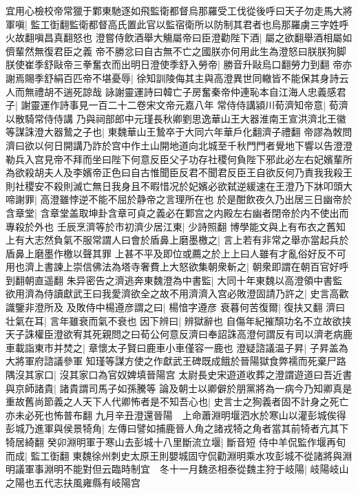 宜用心檢校帝常獵于鄴東馳逐如飛監衛都督烏那羅受工伐從後呼曰天子勿走馬大將軍嗔|{
	監工衘翻監衛都督高氏置此官以監宿衛所以防制其君者也烏那羅虜三字姓呼火故翻嗔昌真翻怒也}
澄嘗侍飲酒舉大觴屬帝曰臣澄勸陛下酒|{
	屬之欲翻舉酒相屬如儕輩然無復君臣之義}
帝不勝忿曰自古無不亡之國朕亦何用此生為澄怒曰朕朕狗脚朕使崔季舒敺帝三拳奮衣而出明日澄使季舒入勞帝|{
	勝音升敺烏口翻勞力到翻}
帝亦謝焉賜季舒絹百匹帝不堪憂辱|{
	徐知訓陵侮其主與高澄異世同轍皆不能保其身詩云人而無禮胡不遄死諒哉}
詠謝靈運詩曰韓亡子房奮秦帝仲連恥本自江海人忠義感君子|{
	謝靈運作詩事見一百二十二卷宋文帝元嘉八年}
常侍侍講潁川荀濟知帝意|{
	荀濟以散騎常侍侍講}
乃與祠部郎中元瑾長秋卿劉思逸華山王大器淮南王宣洪濟北王徽等謀誅澄大器鷙之子也|{
	東魏華山王鷙卒于大同六年華戶化翻濟子禮翻}
帝謬為敇問濟曰欲以何日開講乃詐於宫中作土山開地道向北城至千秋門門者覺地下響以告澄澄勒兵入宫見帝不拜而坐曰陛下何意反臣父子功存社稷何負陛下邪此必左右妃嬪輩所為欲殺胡夫人及李嬪帝正色曰自古惟聞臣反君不聞君反臣王自欲反何乃責我我殺王則社稷安不殺則滅亡無日我身且不暇惜况於妃嬪必欲弑逆緩速在王澄乃下牀叩頭大啼謝罪|{
	高澄雖悖逆不能不屈於静帝之言理所在也}
於是酣飲夜久乃出居三日幽帝於含章堂|{
	含章堂盖取坤卦含章可貞之義必在鄴宫之内殿左右幽者閉帝於内不使出而專殺於外也}
壬辰烹濟等於市初濟少居江東|{
	少詩照翻}
博學能文與上有布衣之舊知上有大志然負氣不服常謂人曰會於盾鼻上磨墨檄之|{
	言上若有非常之舉亦當起兵於盾鼻上磨墨作檄以聲其罪}
上甚不平及即位或薦之於上上曰人雖有才亂俗好反不可用也濟上書諫上崇信佛法為塔寺奢費上大怒欲集朝衆斬之|{
	朝衆即謂在朝百官好呼到翻朝直遥翻}
朱异密告之濟逃奔東魏澄為中書監|{
	大同十年東魏以高澄領中書監}
欲用濟為侍讀獻武王曰我愛濟欲全之故不用濟濟入宫必敗澄固請乃許之|{
	史言高歡識鑒非澄所及}
及敗侍中楊遵彦謂之曰|{
	楊愔字遵彦}
衰暮何苦復爾|{
	復扶又翻}
濟曰壮氣在耳|{
	言年雖衰而氣不衰也}
因下辨曰|{
	辨獄辭也}
自傷年紀摧頹功名不立故欲挟天子誅權臣澄欲宥其死親問之曰荀公何意反濟曰奉詔誅高澄何謂反有司以濟老病鹿車載詣東市并焚之|{
	章懷太子賢曰鹿車小車僅容一鹿也}
澄疑諮議温子昇|{
	子昇盖為大將軍府諮議參軍}
知瑾等謀方使之作獻武王碑既成餓於晉陽獄食弊襦而死棄尸路隅沒其家口|{
	沒其家口為官奴婢填晉陽宫}
太尉長史宋遊道收葬之澄謂遊道曰吾近書與京師諸貴|{
	諸貴謂司馬子如孫騰等}
論及朝士以卿僻於朋黨將為一病今乃知卿真是重故舊尚節義之人天下人代卿怖者是不知吾心也|{
	史言士之狥義者固不計身之死亡亦未必死也怖普布翻}
九月辛丑澄還晉陽　上命蕭淵明堰泗水於寒山以灌彭城俟得彭城乃進軍與侯景犄角|{
	左傳曰譬如捕鹿晉人角之諸戎犄之角者當其前犄者亢其下犄居綺翻}
癸卯淵明軍于寒山去彭城十八里斷流立堰|{
	斷音短}
侍中羊侃監作堰再旬而成|{
	監工衘翻}
東魏徐州刺史太原王則嬰城固守侃勸淵明乘水攻彭城不從諸將與淵明議軍事淵明不能對但云臨時制宜　冬十一月魏丞相泰從魏主狩于岐陽|{
	岐陽岐山之陽也五代志扶風雍縣有岐陽宫}
